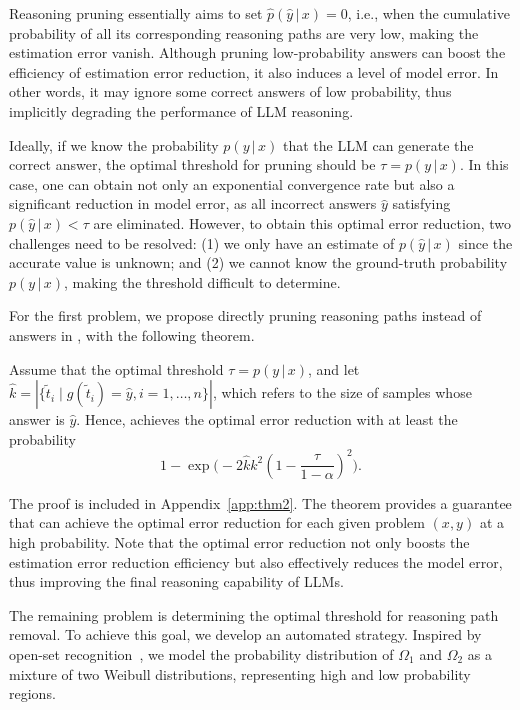Reasoning pruning essentially aims to set $\hat{p}(\hat{y} \,|\, x) = 0$, i.e., when the cumulative probability of all its corresponding reasoning paths are very low, 
making the estimation error vanish. 
Although pruning low-probability answers can boost the efficiency of estimation error reduction, it also induces a level of model error. 
In other words, it may ignore some correct answers of low probability, thus implicitly degrading the performance of LLM reasoning.  

Ideally, if we know the probability $p(y \,|\, x)$ that the LLM can generate the correct answer, the optimal threshold for pruning should be $\tau = p(y \,|\, x)$. In this case, one can obtain not only an exponential convergence rate but also a significant reduction in model error, as all incorrect answers $\hat{y}$ satisfying $p(\hat{y} \,|\, x) < \tau$ are eliminated. However, to obtain this optimal error reduction, two challenges need to be resolved: (1) we only have an estimate of $p(\hat{y} \,|\, x)$ since the accurate value is unknown; and (2) we cannot know the ground-truth probability $p(y \,|\, x)$, making the threshold difficult to determine. 

For the first problem, we propose directly pruning reasoning paths instead of answers in \RP, with the following theorem. 
\begin{theorem} \label{thm:thm2}
Assume that the optimal threshold $\tau = p(y \,|\, x)$, and let $\hat{k} = |\{\tilde{t}_i \mid g(\tilde{t}_i) = \hat{y}, i=1,\dots,n\}|$, which refers to the size of samples whose answer is $\hat{y}$. 
Hence, \RP achieves the optimal error reduction with at least the probability 
\begin{equation*}
1 - \exp\Big(-{2\hat{k}k^2} (1 - \frac{\tau}{1 - \alpha})^2\Big).
\end{equation*}
\end{theorem}
\begin{remark}
The proof is included in Appendix~\ref{app:thm2}. 
The theorem provides a guarantee that \RP can achieve the optimal error reduction for each given problem $(x, y)$ at a high probability. 
Note that the optimal error reduction not only boosts the estimation error reduction efficiency but also effectively reduces the model error, thus improving the final reasoning capability of LLMs.
\end{remark}

The remaining problem is determining the optimal threshold for reasoning path removal. 
To achieve this goal, we develop an automated strategy. 
Inspired by open-set recognition~\citep{Bendale16openmax}, we model the probability distribution of $\Omega_1$ and $\Omega_2$ as a mixture of two Weibull distributions, representing high and low probability regions.

